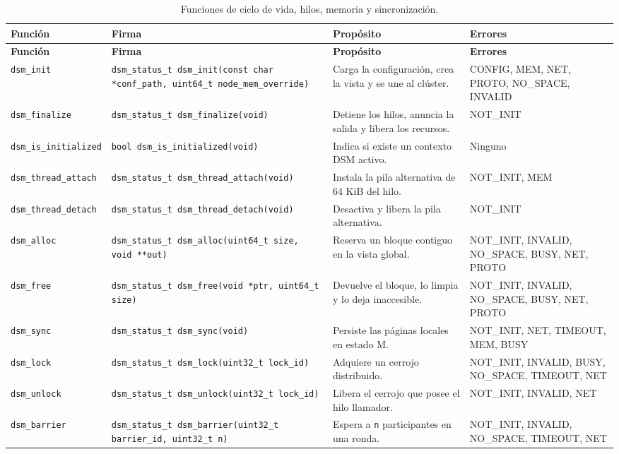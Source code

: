 {\scriptsize
\begin{xltabular}{\linewidth}{l P{5.4cm} Y >{\RaggedRight\arraybackslash{}}p{2.7cm}}
\caption{Funciones de ciclo de vida, hilos, memoria y sincronización.}\label{tab:funciones-base}\\
\toprule
\textbf{Función} & \textbf{Firma} & \textbf{Propósito} & \textbf{Errores} \\
\midrule
\endfirsthead
\toprule
\textbf{Función} & \textbf{Firma} & \textbf{Propósito} & \textbf{Errores} \\
\midrule
\endhead
\texttt{dsm\_init} & \texttt{dsm\_status\_t dsm\_init(const char *conf\_path, uint64\_t node\_mem\_override)} & Carga la configuración, crea la vista y se une al clúster. & CONFIG, MEM, NET, PROTO, NO\_SPACE, INVALID \\
\texttt{dsm\_finalize} & \texttt{dsm\_status\_t dsm\_finalize(void)} & Detiene los hilos, anuncia la salida y libera los recursos. & NOT\_INIT \\
\texttt{dsm\_is\_initialized} & \texttt{bool dsm\_is\_initialized(void)} & Indica si existe un contexto DSM activo. & Ninguno \\
\texttt{dsm\_thread\_attach} & \texttt{dsm\_status\_t dsm\_thread\_attach(void)} & Instala la pila alternativa de 64 KiB del hilo. & NOT\_INIT, MEM \\
\texttt{dsm\_thread\_detach} & \texttt{dsm\_status\_t dsm\_thread\_detach(void)} & Desactiva y libera la pila alternativa. & NOT\_INIT \\
\texttt{dsm\_alloc} & \texttt{dsm\_status\_t dsm\_alloc(uint64\_t size, void **out)} & Reserva un bloque contiguo en la vista global. & NOT\_INIT, INVALID, NO\_SPACE, BUSY, NET, PROTO \\
\texttt{dsm\_free} & \texttt{dsm\_status\_t dsm\_free(void *ptr, uint64\_t size)} & Devuelve el bloque, lo limpia y lo deja inaccesible. & NOT\_INIT, INVALID, NO\_SPACE, BUSY, NET, PROTO \\
\texttt{dsm\_sync} & \texttt{dsm\_status\_t dsm\_sync(void)} & Persiste las páginas locales en estado M. & NOT\_INIT, NET, TIMEOUT, MEM, BUSY \\
\texttt{dsm\_lock} & \texttt{dsm\_status\_t dsm\_lock(uint32\_t lock\_id)} & Adquiere un cerrojo distribuido. & NOT\_INIT, INVALID, BUSY, NO\_SPACE, TIMEOUT, NET \\
\texttt{dsm\_unlock} & \texttt{dsm\_status\_t dsm\_unlock(uint32\_t lock\_id)} & Libera el cerrojo que posee el hilo llamador. & NOT\_INIT, INVALID, NET \\
\texttt{dsm\_barrier} & \texttt{dsm\_status\_t dsm\_barrier(uint32\_t barrier\_id, uint32\_t n)} & Espera a \texttt{n} participantes en una ronda. & NOT\_INIT, INVALID, NO\_SPACE, TIMEOUT, NET \\
\bottomrule
\end{xltabular}
}

